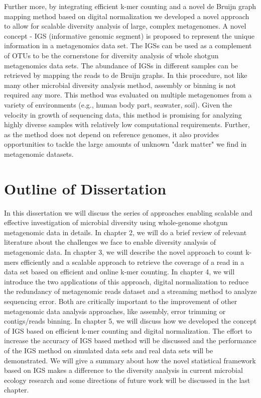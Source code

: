              Further    more, by integrating efficient k-mer counting and a
             novel de Bruijn graph mapping method based on digital
             normalization we developed a novel approach to allow for scalable
             diversity analysis of large, complex metagenomes.  A novel concept
             - IGS (informative genomic segment) is proposed to represent the
             unique information in a metagenomics data set. The IGSs can be
             used as a complement of OTUs to be the cornerstone for diversity
             analysis of whole shotgun metagenomics data sets. The abundance of
             IGSs in different samples can be retrieved by mapping the reads to
             de Bruijn graphs. In this procedure, not like many other microbial
             diversity analysis method, assembly or binning is not required any
             more. This method was evaluated on multiple metagenomes from a
             variety of environments (e.g., human body part, seawater, soil).
             Given the velocity in growth of sequencing data, this method is 
             promising for analyzing highly diverse samples with relatively low
             computational requirements. Further, as the method does not depend
             on reference genomes, it also provides opportunities to tackle the
             large amounts of unknown "dark matter" we 
             find in metagenomic datasets.


\section{Outline of Dissertation}
In this dissertation
we will discuss the series of approaches enabling scalable
and effective investigation of microbial diversity using whole-genome shotgun
metagenomic data in details. In chapter 2, we will do a brief review of relevant
 literature about the challenges
we face to enable diversity analysis of metagenomic data. In chapter 3, we will 
describe the novel approach to count k-mers
efficiently and a scalable approach to retrieve the coverage of a read in a 
data set based on efficient and online k-mer counting. In chapter 4, we will  introduce 
the two applications of this approach, digital normalization to reduce the redundancy of metagenomic reads
dataset and a streaming method to analyze sequencing error. Both are critically important to 
the improvement of
other metagenomic data analysis approaches, like
assembly, error trimming or contigs/reads binning. In chapter 5, we will discuss
how we developed the concept 
of IGS based on efficient k-mer counting and digital normalization.  
The effort to increase the accuracy of IGS based method 
will be discussed and the performance of the IGS method on simulated data sets and
real data sets will be demonstrated. 
We will give a summary about how the novel statistical framework based on IGS makes
 a difference to the diversity analysis in current microbial ecology research and 
 some directions of future work will be discussed in the last chapter.


